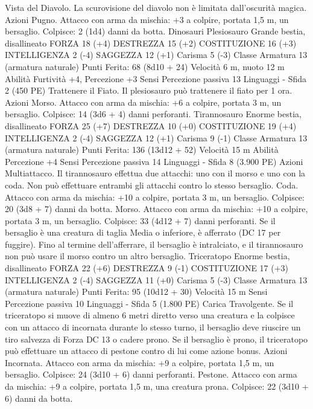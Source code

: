 \begin{multicols}{2}
Vista del Diavolo. La scurovisione del diavolo non è limitata
dall’oscurità magica.
Azioni
Pugno. Attacco con arma da mischia: +3 a colpire, portata 1,5
m, un bersaglio.
Colpisce: 2 (1d4) danni da botta.
Dinosauri
Plesiosauro
Grande bestia, disallineato
FORZA 18 (+4)
DESTREZZA 15 (+2)
COSTITUZIONE 16 (+3)
INTELLIGENZA 2 (-4)
SAGGEZZA 12 (+1)
Carisma 5 (-3)
Classe Armatura 13 (armatura naturale)
\hspace*{0pt}\hfill{Punti Ferita}: 68 (8d10 + 24)
Velocità 6 m, nuoto 12 m
Abilità Furtività +4, Percezione +3
Sensi Percezione passiva 13
Linguaggi -
Sfida 2 (450 PE)
Trattenere il Fiato. Il plesiosauro può trattenere il fiato per 1
ora.
Azioni
Morso. Attacco con arma da mischia: +6 a colpire, portata 3 m,
un bersaglio.
Colpisce: 14 (3d6 + 4) danni perforanti.
Tirannosauro
Enorme bestia, disallineato
FORZA 25 (+7)
DESTREZZA 10 (+0)
COSTITUZIONE 19 (+4)
INTELLIGENZA 2 (-4)
SAGGEZZA 12 (+1)
Carisma 9 (-1)
Classe Armatura 13 (armatura naturale)
\hspace*{0pt}\hfill{Punti Ferita}: 136 (13d12 + 52)
Velocità 15 m
Abilità Percezione +4
Sensi Percezione passiva 14
Linguaggi -
Sfida 8 (3.900 PE)
Azioni
Multiattacco. Il tirannosauro effettua due attacchi: uno con il
morso e uno con la coda. Non può effettuare entrambi gli
attacchi contro lo stesso bersaglio.
Coda. Attacco con arma da mischia: +10 a colpire, portata 3 m,
un bersaglio.
Colpisce: 20 (3d8 + 7) danni da botta.
Morso. Attacco con arma da mischia: +10 a colpire, portata 3 m,
un bersaglio.
Colpisce: 33 (4d12 + 7) danni perforanti. Se il bersaglio è una
creatura di taglia Media o inferiore, è afferrato (DC 17 per
fuggire). Fino al termine dell’afferrare, il bersaglio è intralciato,
e il tirannosauro non può usare il morso contro un altro bersaglio.
Triceratopo
Enorme bestia, disallineato
FORZA 22 (+6)
DESTREZZA 9 (-1)
COSTITUZIONE 17 (+3)
INTELLIGENZA 2 (-4)
SAGGEZZA 11 (+0)
Carisma 5 (-3)
Classe Armatura 13 (armatura naturale)
\hspace*{0pt}\hfill{Punti Ferita}: 95 (10d12 + 30)
Velocità 15 m
Sensi Percezione passiva 10
Linguaggi -
Sfida 5 (1.800 PE)
Carica Travolgente. Se il triceratopo si muove di almeno 6 metri
diretto verso una creatura e la colpisce con un attacco di
incornata durante lo stesso turno, il bersaglio deve riuscire un
tiro salvezza di Forza DC 13 o cadere prono. Se il bersaglio è
prono, il triceratopo può effettuare un attacco di pestone contro
di lui come azione bonus.
Azioni
Incornata. Attacco con arma da mischia: +9 a colpire, portata
1,5 m, un bersaglio.
Colpisce: 24 (3d10 + 6) danni perforanti.
Pestone. Attacco con arma da mischia: +9 a colpire, portata 1,5
m, una creatura prona.
Colpisce: 22 (3d10 + 6) danni da botta.
 

\end{multicols}
